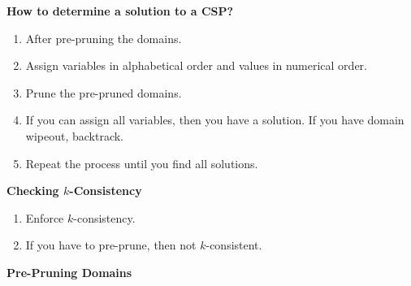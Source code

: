 \begin{process} \textbf{How to determine a solution to a CSP?}
    \begin{enumerate}
        \item After pre-pruning the domains. 
        \item Assign variables in alphabetical order and values in numerical order. 
        \item Prune the pre-pruned domains.
        \item If you can assign all variables, then you have a solution. If you have domain wipeout, backtrack.
        \item Repeat the process until you find all solutions. 
    \end{enumerate}
\end{process}

\begin{process} \textbf{Checking $k$-Consistency}
    \begin{enumerate}
        \item Enforce $k$-consistency. 
        \item If you have to pre-prune, then not $k$-consistent.
    \end{enumerate}
\end{process}
\newpage

\begin{example} \textbf{Pre-Pruning Domains}
\end{example}
\newpage

